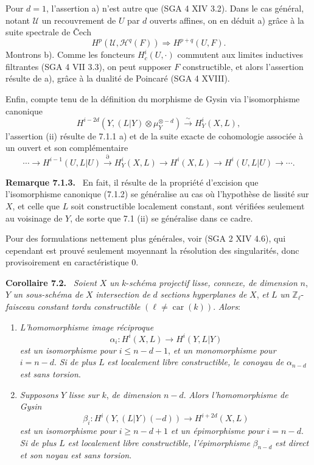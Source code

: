 \documentclass[11pt]{article}
\newenvironment{statement}[1]{\par\medskip\noindent\textbf{#1.}\ }{\par\medskip}
\begin{document}
Pour $d=1$, l'assertion a) n'est autre que (SGA 4 XIV 3.2). Dans le cas général, notant $\mathcal U$ un recouvrement de $U$ par $d$ ouverts affines, on en déduit a) grâce à la suite spectrale de Čech
\[
H^p(\mathcal U,\mathcal H^q(F))\Rightarrow H^{p+q}(U,F).
\]
Montrons b). Comme les foncteurs $H_c^i(U,\cdot)$ commutent aux limites inductives filtrantes (SGA 4 VII 3.3), on peut supposer $F$ constructible, et alors l'assertion résulte de a), grâce à la dualité de Poincaré (SGA 4 XVIII).

Enfin, compte tenu de la définition du morphisme de Gysin via l'isomorphisme canonique
\[
H^{i-2d}(Y,(L|Y)\otimes\mu_Y^{\otimes -d})\xrightarrow{\sim} H^i_Y(X,L),
\tag{7.1.2}
\]
l'assertion (ii) résulte de 7.1.1 a) et de la suite exacte de cohomologie associée à un ouvert et son complémentaire
\[
\cdots\to H^{i-1}(U,L|U)\xrightarrow{\partial}H^i_Y(X,L)\to H^i(X,L)\to H^i(U,L|U)\to\cdots .
\]

\begin{statement}{Remarque 7.1.3}
En fait, il résulte de la propriété d'excision que l'isomorphisme canonique (7.1.2) se généralise au cas où l'hypothèse de lissité sur $X$, et celle que $L$ soit constructible localement constant, sont vérifiées seulement au voisinage de $Y$, de sorte que 7.1 (ii) se généralise dans ce cadre.

Pour des formulations nettement plus générales, voir (SGA 2 XIV 4.6), qui cependant est prouvé seulement moyennant la résolution des singularités, donc provisoirement en caractéristique $0$.
\end{statement}

\begin{statement}{Corollaire 7.2}
\emph{Soient} $X$ \emph{un} $k$-\emph{schéma projectif lisse, connexe, de dimension} $n$, $Y$ \emph{un sous-schéma de} $X$ \emph{intersection de} $d$ \emph{sections hyperplanes de} $X$, \emph{et} $L$ \emph{un} $\mathbb Z_\ell$-\emph{faisceau constant tordu constructible} $(\ell\ne\operatorname{car}(k))$. \emph{Alors}:
\begin{enumerate}[label=(\roman*)]
\item \emph{L'homomorphisme image réciproque}
\[
\alpha_i:H^i(X,L)\to H^i(Y,L|Y)
\]
\emph{est un isomorphisme pour} $i\le n-d-1$, \emph{et un monomorphisme pour} $i=n-d$. \emph{Si de plus} $L$ \emph{est localement libre constructible, le conoyau de} $\alpha_{n-d}$ \emph{est sans torsion}.
\item \emph{Supposons} $Y$ \emph{lisse sur} $k$, \emph{de dimension} $n-d$. \emph{Alors l'homomorphisme de Gysin}
\[
\beta_i:H^i(Y,(L|Y)(-d))\to H^{i+2d}(X,L)
\]
\emph{est un isomorphisme pour} $i\ge n-d+1$ \emph{et un épimorphisme pour} $i=n-d$. \emph{Si de plus} $L$ \emph{est localement libre constructible, l'épimorphisme} $\beta_{n-d}$ \emph{est direct et son noyau est sans torsion}.
\end{enumerate}
\end{statement}
\end{document}
